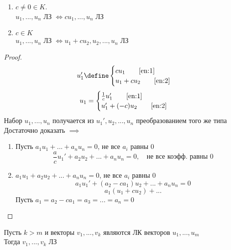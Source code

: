 \begin{props}
\begin{enumerate}
        \item \label{en:1} $ c \ne 0 \in K$. \\
        $u_1, ..., u_n$ ЛЗ $\iff cu_1, ..., u_n$ ЛЗ
        \item \label{en:2} $c \in K$ \\
        $u_1, ..., u_n$ ЛЗ $\iff u_1 + cu_2, u_2, ..., u_n $ ЛЗ
    \end{enumerate}
    \begin{proof}
    	$$ u_1' \define
        \begin{cases}
            cu_1 \qquad \eqref{en:1} \\
            u_1 + cu_2 \qquad \eqref{en:2}
        \end{cases} $$
        $$ u_1 =
        \begin{cases}
            \frac1cu_1' \qquad \eqref{en:1} \\
            u_1' + (-c)u_2 \qquad \eqref{en:2}
        \end{cases} $$
        Набор $u_1, ..., u_n$ получается из $u_1', u_2, ..., u_n$ преобразованием того же типа \\
        Достаточно доказать $\implies$
        \begin{enumerate}
        	\item Пусть $a_1u_1 + ... + a_nu_n = 0$, не все $a_i$ равны 0
            $$ \frac{a}c u_1' + a_2u_2 + ... + a_nu_n = 0, \quad \text{не все коэфф. равны 0} $$
            \item $a_1u_1 + a_2u_2 + ... + a_nu_n = 0$, не все $a_i$ равны 0
            $$ a_1u_1' + (a_2 - ca_1)u_2 + ... + a_nu_n = 0 $$
            $$ a_1(u_1 + cu_2) + ... $$
            Пусть $ a_1 = a_2 - ca_1 = a_3 = ... = a_n = 0 $
        \end{enumerate}
    \end{proof}
\end{props}

\begin{theorem}
	Пусть $k > m$ и векторы $v_1, ..., v_k$ являются ЛК векторов $u_1, ..., u_m$ \\
    Тогда $v_1, ..., v_k$ ЛЗ
\end{theorem}

